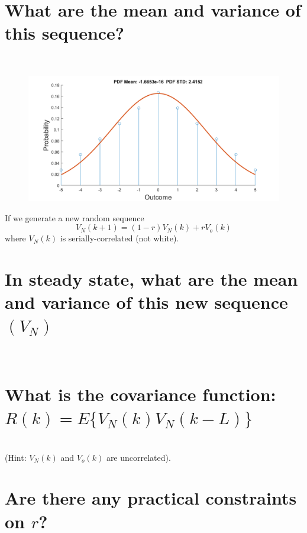\documentclass[12pt,letterpaper, onecolumn]{exam}
\begin{document}
\begin{questions}
\begin{parts}
		\part{What are the mean and variance of this sequence?}\\
		\solution
		\begin{figure}[h!]
			\includegraphics[width=\linewidth]{Q4_a.png}
		\end{figure}
		If we generate a new random sequence \[V_N(k+1) = (1 - r)V_N(k) + rV_o(k)\]where $V_N(k)$ is serially-correlated (not white).
		\part{In steady state, what are the mean and variance of this new sequence $(V_N)$}\\
		\solution
		\part{What is the covariance function: $R(k) = E\{V_N(k)V_N(k-L)\}$}\\
		(Hint: $V_N(k)$ and $V_o(k)$ are uncorrelated).\\
		\solution
		\part{Are there any practical constraints on $r$?}\\
		\solution
	\end{parts}
	\clearpage
	\begin{parts}

\end{parts}
\end{questions}
\end{document}
